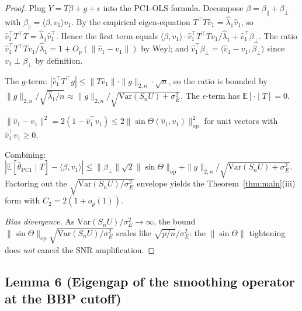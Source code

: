 \begin{proof}
Plug $Y=T\beta+g+\epsilon$ into the PC1-OLS formula. Decompose
$\beta=\beta_\parallel+\beta_\perp$ with $\beta_\parallel=\langle\beta,v_1\rangle v_1$.
By the empirical eigen-equation $T^\top T\widehat v_1=\widehat\lambda_1\widehat v_1$,
so $\widehat v_1^\top T^\top T=\widehat\lambda_1\widehat v_1^\top$. Hence the first
term equals $\langle\beta,v_1\rangle\cdot\widehat v_1^\top T^\top T v_1/\widehat\lambda_1
+\widehat v_1^\top\beta_\perp$.
The ratio $\widehat v_1^\top T^\top T v_1/\widehat\lambda_1=1+O_p(\|\widehat v_1-v_1\|)$
by Weyl; and $\widehat v_1^\top\beta_\perp=\langle\widehat v_1-v_1,\beta_\perp\rangle$
since $v_1\perp\beta_\perp$ by definition.

The $g$-term: $|\widehat v_1^\top T^\top g|\le\|T\widehat v_1\|\cdot\|g\|_{2,n}\cdot\sqrt n$,
so the ratio is bounded by $\|g\|_{2,n}/\sqrt{\widehat\lambda_1/n}\approx\|g\|_{2,n}/\sqrt{\mathrm{Var}(S_nU)+\sigma_E^2}$.
The $\epsilon$-term has $\mathbb E[\cdot\mid T]=0$.

$\|\widehat v_1-v_1\|^2=2(1-\widehat v_1^\top v_1)\le 2\|\sin\Theta(\widehat v_1,v_1)\|_{\mathrm{op}}^2$
for unit vectors with $\widehat v_1^\top v_1\ge 0$.

Combining: $|\mathbb E[\widehat\theta_{\mathrm{PC1}}\mid T]-\langle\beta,v_1\rangle|
\le\|\beta_\perp\|\sqrt 2\|\sin\Theta\|_{\mathrm{op}}+\|g\|_{2,n}/\sqrt{\mathrm{Var}(S_nU)+\sigma_E^2}$.
Factoring out the $\sqrt{\mathrm{Var}(S_nU)/\sigma_E^2}$ envelope yields the
Theorem~\ref{thm:main}(iii) form with $C_2=2(1+o_p(1))$.

\emph{Bias divergence.} As $\mathrm{Var}(S_nU)/\sigma_E^2\to\infty$, the bound
$\|\sin\Theta\|_{\mathrm{op}}\sqrt{\mathrm{Var}(S_nU)/\sigma_E^2}$ scales like
$\sqrt{p/n}/\sigma_E^2$: the $\|\sin\Theta\|$ tightening does \emph{not} cancel
the SNR amplification.
\end{proof}

\subsection*{Lemma 6 (Eigengap of the smoothing operator at the BBP cutoff)}

